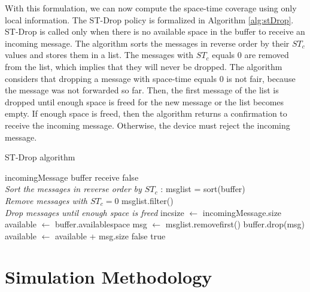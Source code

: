 With this formulation, we can now compute the space-time coverage using only local information. The ST-Drop policy is formalized in Algorithm \ref{alg:stDrop}. ST-Drop is called only when there is no available space in the buffer to receive an incoming message. The algorithm sorts the messages in reverse order by their $ST_c$ values and stores them in a list. The messages with $ST_c$ equals 0 are removed from the list, which implies that they will never be dropped. The algorithm considers that
dropping a message with space-time equals 0 is not fair, because the message was not forwarded so far. Then, the first message of the list is dropped until enough space is freed for the new message or the list becomes empty. If enough space is freed, then the algorithm returns a confirmation to receive the incoming message. Otherwise, the device must reject the incoming message.

\begin{algorithm}

 \caption{ST-Drop algorithm}
 \label{alg:stDrop}
 \begin{algorithmic}[1]
 \renewcommand{\algorithmicrequire}{\textbf{Input:}}
 \renewcommand{\algorithmicensure}{\textbf{Output:}}
 \REQUIRE incomingMessage
 \REQUIRE buffer
 \ENSURE  receive
    \RETURN false
  \ENDIF
 \\ \textit{Sort the messages in reverse order by $ST_c$} :
  \STATE msglist = sort(buffer)
 \\ \textit{Remove messages with $ST_c = 0$}
  \STATE msglist.filter()
 \\ \textit{Drop messages until enough space is freed}
  \STATE incsize $\leftarrow$ incomingMessage.size
  \STATE available $\leftarrow$ buffer.availablespace
    \STATE msg $\leftarrow$ msglist.removefirst()
    \STATE buffer.drop(msg)
    \STATE available $\leftarrow$ available + msg.size
  \ENDWHILE
  \RETURN false
  \ELSE
  \RETURN true
  \ENDIF
 \end{algorithmic}
 \end{algorithm}

\section{Simulation Methodology}
\label{sec:experiments}

